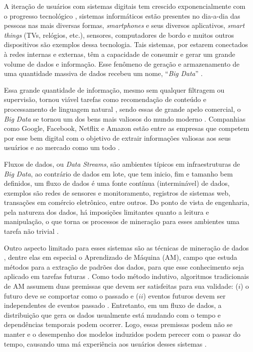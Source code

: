 A iteração de usuários com sistemas digitais tem crescido exponencialmente com
o progresso tecnológico \cite{dean2008mapreduce,atzori2010internet}, sistemas
informáticos estão presentes no dia-a-dia das pessoas nas mais diversas formas,
\textit{smartphones} e seus diversos aplicativos, \textit{smart things} (TVs,
relógios, etc.), sensores, computadores de bordo e muitos outros dispositivos
são exemplos dessa tecnologia. Tais sistemas, por estarem conectados à redes
internas e externas, têm a capacidade de consumir e gerar um grande volume de
dados e informação. Esse fenômeno de geração e armazenamento de uma quantidade massiva de
dados recebeu um nome, ``\textit{Big Data}''
\cite{mcafee2012big}.

Essa grande quantidade de informação, mesmo sem qualquer filtragem ou supervisão, tornou viável tarefas como recomendação de conteúdo e processamento de linguagem natural \cite{halevy2009unreasonable}, sendo essas de grande apelo comercial, o \textit{Big Data} se tornou um dos bens mais valiosos do mundo moderno \cite{economist2017world}. Companhias como Google\regsymbol{}, Facebook\regsymbol{}, Netflix\regsymbol{} e Amazon\regsymbol{} estão entre as empresas que competem por esse bem digital com o objetivo de extrair informações valiosas aos seus usuários e ao mercado como um todo \cite{tarnoff2018big, finger2014data}.

Fluxos de dados, ou \textit{Data Streams}, são ambientes típicos em infraestruturas de \textit{Big Data}, ao contrário de dados em lote, que tem inicio, fim e tamanho bem definidos, um fluxo de dados é uma fonte contínua (interminável) de dados, exemplos são redes de sensores e monitoramento, registros de sistemas web, transações em comércio eletrônico, entre outros. Do ponto de vista de engenharia, pela natureza dos dados, há imposições limitantes quanto a leitura e manipulação, o que torna os processos de mineração para esses
ambientes uma tarefa não trivial \cite{gama2007learning}.

Outro aspecto limitado para esses sistemas são as técnicas de mineração de dados \cite{gama2007learning}, dentre elas em especial o Aprendizado de Máquina (AM), campo que estuda métodos para a extração de padrões dos dados, para que esse conhecimento seja aplicado em tarefas futuras \cite{mitchell1997machine,friedman2001elements}. Como todo método indutivo, algoritmos tradicionais de AM assumem duas premissas que devem ser satisfeitas para sua validade: ($i$) o futuro deve se comportar como o passado e ($ii$) eventos futuros devem ser independentes de eventos passado \cite{vapnik2013nature}. Entretanto, em um fluxo de dados, a distribuição que gera os dados usualmente está mudando com o tempo e dependências temporais podem ocorrer.  Logo, essas premissas podem não se manter e o desempenho dos modelos induzidos podem perecer com o passar do tempo, causando uma má experiência aos usuários desses sistemas \cite{gama2007learning, Johansson2014}.

